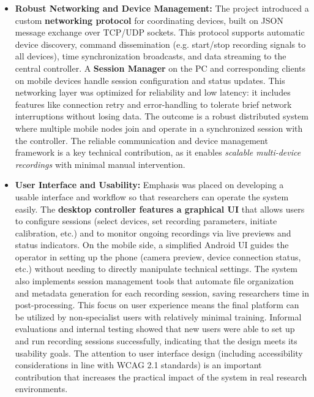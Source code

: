 \begin{itemize}
\item \textbf{Robust Networking and Device Management:} The project introduced a
  custom \textbf{networking protocol} for coordinating devices, built on JSON
  message exchange over TCP/UDP sockets. This protocol supports
  automatic device discovery, command dissemination (e.g. start/stop
  recording signals to all devices), time synchronization broadcasts,
  and data streaming to the central controller. A \textbf{Session Manager} on
  the PC and corresponding clients on mobile devices handle session
  configuration and status updates. This networking layer was optimized
  for reliability and low latency: it includes features like connection
  retry and error-handling to tolerate brief network interruptions
  without losing data. The outcome is a robust distributed system where
  multiple mobile nodes join and operate in a synchronized session with
  the controller. The reliable communication and device management
  framework is a key technical contribution, as it enables \textit{scalable
  multi-device recordings} with minimal manual intervention.

\item \textbf{User Interface and Usability:} Emphasis was placed on developing a
  usable interface and workflow so that researchers can operate the
  system easily. The \textbf{desktop controller features a graphical UI} that
  allows users to configure sessions (select devices, set recording
  parameters, initiate calibration, etc.) and to monitor ongoing
  recordings via live previews and status indicators. On the mobile
  side, a simplified Android UI guides the operator in setting up the
  phone (camera preview, device connection status, etc.) without needing
  to directly manipulate technical settings. The system also implements
  session management tools that automate file organization and metadata
  generation for each recording session, saving researchers time in
  post-processing. This focus on user experience means the final
  platform can be utilized by non-specialist users with relatively
  minimal training. Informal evaluations and internal testing showed
  that new users were able to set up and run recording sessions
  successfully, indicating that the design meets its usability goals.
  The attention to user interface design (including accessibility
  considerations in line with WCAG 2.1 standards) is an important
  contribution that increases the practical impact of the system in real
  research environments.


\end{itemize}
